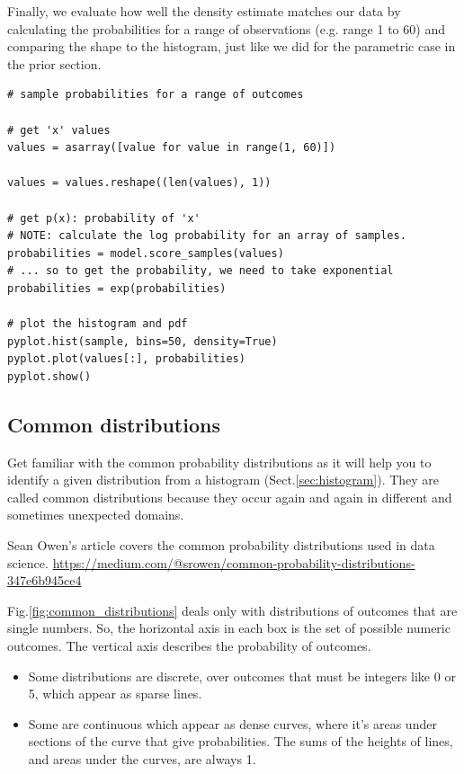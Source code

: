 Finally, we evaluate how well the density estimate matches our data by
calculating the probabilities for a range of observations (e.g. range 1 to 60)
and comparing the shape to the histogram, just like we did for the parametric
case in the prior section.
\begin{lstlisting}
# sample probabilities for a range of outcomes

# get 'x' values
values = asarray([value for value in range(1, 60)])

values = values.reshape((len(values), 1))

# get p(x): probability of 'x'
# NOTE: calculate the log probability for an array of samples.
probabilities = model.score_samples(values)
# ... so to get the probability, we need to take exponential
probabilities = exp(probabilities)

# plot the histogram and pdf
pyplot.hist(sample, bins=50, density=True)
pyplot.plot(values[:], probabilities)
pyplot.show()
\end{lstlisting}

 


 


\subsection{Common distributions}
\label{sec:common-distributions}

Get familiar with the common probability distributions as it will help you to
identify a given distribution from a histogram (Sect.\ref{sec:histogram}).
They are called common distributions because they occur again and again in
different and sometimes unexpected domains.


Sean Owen's article covers the
common probability distributions used in data science.
\url{https://medium.com/@srowen/common-probability-distributions-347e6b945ce4}

Fig.\ref{fig:common_distributions} deals only with distributions of outcomes
that are single numbers. So, the horizontal axis in each box is the set of
possible numeric outcomes. The vertical axis describes the probability of
outcomes.
\begin{itemize}
  \item Some distributions are discrete, over outcomes that must be integers like 0 or
5, which appear as sparse lines. 

  \item Some are continuous which appear as dense curves, where it’s areas under
sections of the curve that give probabilities. The sums of the heights of lines,
and areas under the curves, are always 1.
\end{itemize}

